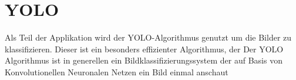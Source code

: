 \chapter{YOLO}
Als Teil der Applikation wird der YOLO-Algorithmus genutzt um die Bilder zu klassifizieren. Dieser ist ein besonders effizienter Algorithmus, der 
Der YOLO Algorithmus ist in generellen ein Bildklassifizierungssystem der auf Basis von Konvolutionellen Neuronalen Netzen ein Bild einmal anschaut